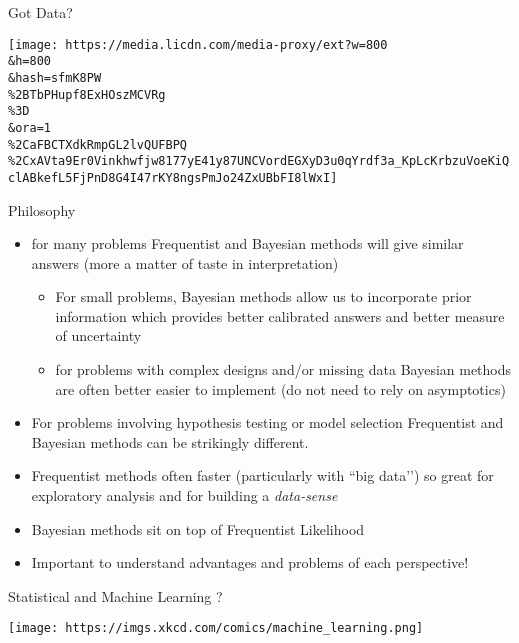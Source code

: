 \documentclass[ignorenonframetext,]{beamer}
\providecommand{\tightlist}{%
  \setlength{\itemsep}{0pt}\setlength{\parskip}{0pt}}
\begin{document}
\begin{frame}{Got Data?}
\protect\hypertarget{got-data}{}

\texttt{[image: https://media.licdn.com/media-proxy/ext?w=800\\\&h=800\\\&hash=sfmK8PW\\\%2BTbPHupf8ExHOszMCVRg\\\%3D\\\&ora=1\\\%2CaFBCTXdkRmpGL2lvQUFBPQ\\\%2CxAVta9Er0Vinkhwfjw8177yE41y87UNCVordEGXyD3u0qYrdf3a\_KpLcKrbzuVoeKiQclABkefL5FjPnD8G4I47rKY8ngsPmJo24ZxUBbFI8lWxI]}

\end{frame}

\begin{frame}{Philosophy}
\protect\hypertarget{philosophy}{}

\begin{itemize}[<+->]
\item
  for many problems Frequentist and Bayesian methods will give similar
  answers (more a matter of taste in interpretation)

  \begin{itemize}[<+->]
  \tightlist
  \item
    For small problems, Bayesian methods allow us to incorporate prior
    information which provides better calibrated answers and better
    measure of uncertainty
  \item
    for problems with complex designs and/or missing data Bayesian
    methods are often better easier to implement (do not need to rely on
    asymptotics)
  \end{itemize}
\item
  For problems involving hypothesis testing or model selection
  Frequentist and Bayesian methods can be strikingly different.
\item
  Frequentist methods often faster (particularly with ``big data’’) so
  great for exploratory analysis and for building a \emph{data-sense}
\item
  Bayesian methods sit on top of Frequentist Likelihood
\item
  Important to understand advantages and problems of each perspective!
\end{itemize}

\end{frame}

\begin{frame}{Statistical and Machine Learning ?}
\protect\hypertarget{statistical-and-machine-learning}{}

\texttt{[image: https://imgs.xkcd.com/comics/machine\_learning.png]}

\end{frame}
\end{document}

